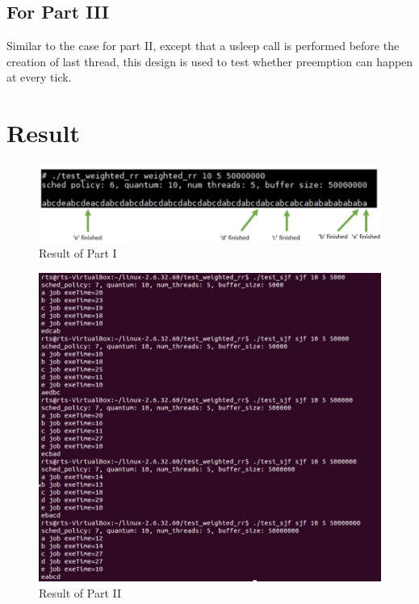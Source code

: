 \documentclass[12pt]{article}
\begin{document}
  \subsection*{For Part III}
    Similar to the case for part II, except that a usleep call is performed before the creation of last thread, this design is used to test whether preemption can happen at every tick.

\section*{Result}

	\begin{figure}[H]
	\centering
	\includegraphics[width=1\textwidth]{fig_result_1}
	\caption{Result of Part I} \label{fig:result1}
	\end{figure}

  \begin{figure}[H]
	\centering
	\includegraphics[width=1\textwidth]{fig_result_2}
	\caption{Result of Part II} \label{fig:result2}
	\end{figure}
\end{document}
